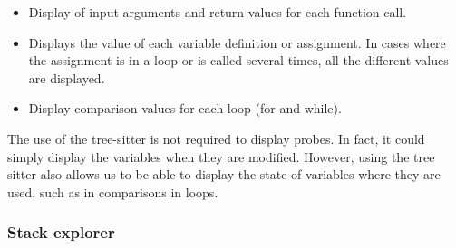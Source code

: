 \documentclass[english,submission]{programming}
\begin{document}
\begin{itemize}
  \item Display of input arguments and return values for each function call.
  \item Displays the value of each variable definition or assignment. In cases where the assignment is in a loop or is called several times, all the different values are displayed.
  \item Display comparison values for each loop (for and while).
\end{itemize}

The use of the tree-sitter is not required to display probes. In fact, it could simply display the variables when they are modified. However, using the tree sitter also allows us to be able to display the state of variables where they are used, such as in comparisons in loops.

\subsubsection{Stack explorer}
\end{document}
